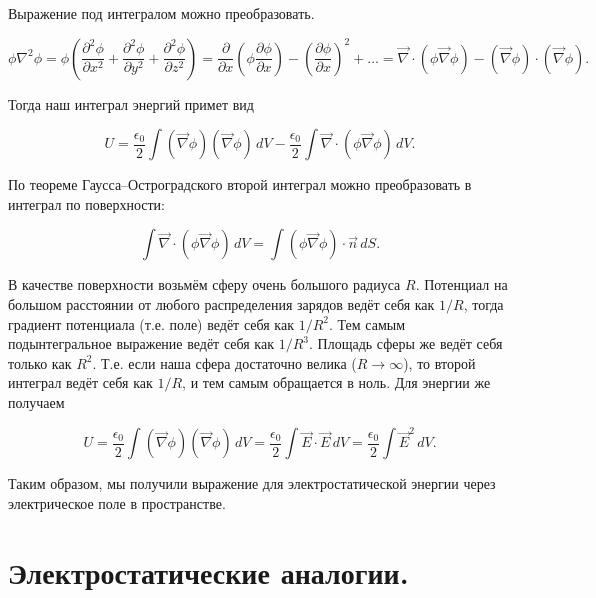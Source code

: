 \documentclass[11pt,a4paper]{article}
\numberwithin{equation}{section}
\newcommand{\pt}{\partial}
\newcommand{\vn}{\vec{\nabla}}
\newcommand{\eps}{\epsilon}
\begin{document}
Выражение под интегралом можно преобразовать. 

\begin{equation}
  \label{eq:energy_field_der_2}
\phi \nabla^2 \phi = \phi \left( \frac{\pt^2 \phi}{\pt x^2} +
  \frac{\pt^2 \phi}{\pt y^2} +\frac{\pt^2 \phi}{\pt z^2} \right) =
\frac{\pt}{\pt x} \left( \phi \frac{\pt \phi}{\pt x} \right) - \left(
  \frac{\pt\phi}{\pt x} \right)^2 + \ldots = \vn \cdot (\phi \vn \phi)
- (\vn \phi) \cdot (\vn \phi).
\end{equation}

Тогда наш интеграл энергий примет вид

\begin{equation}
  \label{eq:energy_field_der_3}
  U = \frac{\eps_0}{2} \int (\vn \phi) (\vn \phi) \, dV -
  \frac{\eps_0}{2} \int \vn \cdot (\phi \vn \phi)\, dV.
\end{equation}

По теореме Гаусса--Остроградского второй интеграл можно преобразовать
в интеграл по поверхности: 

\begin{equation}
  \label{eq:energy_field_der_4}
   \int \vn \cdot (\phi \vn \phi)\, dV = \int (\phi \vn \phi) \cdot
   \vec{n}\, dS.
\end{equation}

В качестве поверхности возьмём сферу очень
большого радиуса $R$. Потенциал на большом расстоянии от любого
распределения зарядов ведёт себя как $1/R$, тогда градиент потенциала
(т.е. поле) ведёт себя как $1/R^2$. Тем самым подынтегральное
выражение ведёт себя как $1/R^3$. Площадь сферы же ведёт себя только
как $R^2$. Т.е. если наша сфера достаточно велика ($R \to \infty$), то
второй интеграл ведёт себя как $1/R$, и тем самым обращается в
ноль. Для энергии же получаем

\begin{equation}
  \label{eq:energy_field_der_5}
  U = \frac{\eps_0}{2} \int (\vn \phi) (\vn \phi) \, dV =
  \frac{\eps_0}{2} \int \vec{E} \cdot \vec{E} \, dV = \frac{\eps_0}{2}
  \int \vec{E}^2 \, dV.
\end{equation}

Таким образом, мы получили выражение для электростатической энергии
через электрическое поле в пространстве. 

\section{Электростатические аналогии. }
\label{sec:es_analogs}
\end{document}
